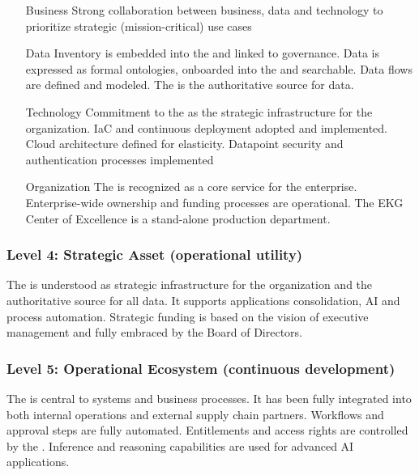 \begin{itemize}[leftmargin=1in]

    \item[Business]     Strong collaboration between business, data and technology to prioritize strategic
                        (mission-critical) use cases
    \item[Data]         Inventory is embedded into the  and linked to governance.
                        Data is expressed as formal ontologies, onboarded into the  and searchable.
                        Data flows are defined and modeled.
                        The  is the authoritative source for data.
    \item[Technology]   Commitment to the  as the strategic infrastructure for the organization.
                        IaC and continuous deployment adopted and implemented.
                        Cloud architecture defined for elasticity.
                        Datapoint security and authentication processes implemented
    \item[Organization] The  is recognized as a core service for the enterprise.
                        Enterprise-wide ownership and funding processes are operational.
                        The EKG Center of Excellence is a stand-alone production department.

\end{itemize}

\subsubsection{Level 4: Strategic Asset (operational utility)}

The  is understood as strategic infrastructure for the organization and the authoritative source
for all data.
It supports applications consolidation, AI and process automation.
Strategic funding is based on the vision of executive management and fully embraced by the Board of Directors.

\subsubsection{Level 5: Operational Ecosystem (continuous development)}

The  is central to systems and business processes.
It has been fully integrated into both internal operations and external supply chain partners.
Workflows and approval steps are fully automated.
Entitlements and access rights are controlled by the .
Inference and reasoning capabilities are used for advanced AI applications.
